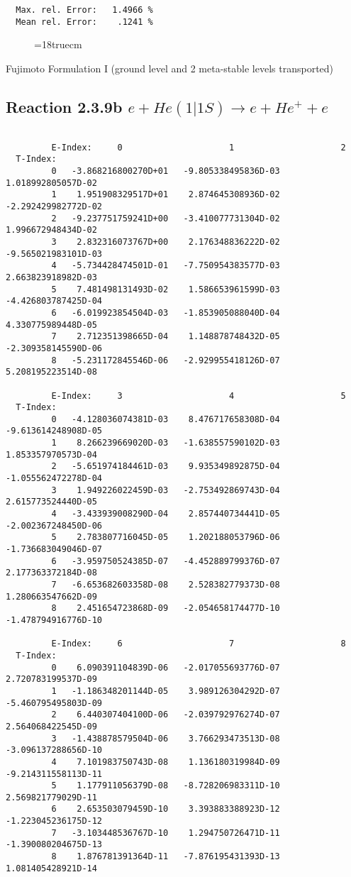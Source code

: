 \begin{verbatim}
  Max. rel. Error:   1.4966 %
  Mean rel. Error:    .1241 %

\end{verbatim}
\begin{figure} \label{2.3.9a}
\epsfxsize=18truecm
\end{figure}
\newpage


 Fujimoto Formulation I (ground level and 2 meta-stable levels transported)

\subsection{
Reaction 2.3.9b  $e + He(1|1S) \rightarrow e + He^+ + e  $
}


\begin{verbatim}

         E-Index:     0                     1                     2
  T-Index:
         0   -3.868216800270D+01   -9.805338495836D-03    1.018992805057D-02
         1    1.951908329517D+01    2.874645308936D-02   -2.292429982772D-02
         2   -9.237751759241D+00   -3.410077731304D-02    1.996672948434D-02
         3    2.832316073767D+00    2.176348836222D-02   -9.565021983101D-03
         4   -5.734428474501D-01   -7.750954383577D-03    2.663823918982D-03
         5    7.481498131493D-02    1.586653961599D-03   -4.426803787425D-04
         6   -6.019923854504D-03   -1.853905088040D-04    4.330775989448D-05
         7    2.712351398665D-04    1.148878748432D-05   -2.309358145590D-06
         8   -5.231172845546D-06   -2.929955418126D-07    5.208195223514D-08

         E-Index:     3                     4                     5
  T-Index:
         0   -4.128036074381D-03    8.476717658308D-04   -9.613614248908D-05
         1    8.266239669020D-03   -1.638557590102D-03    1.853357970573D-04
         2   -5.651974184461D-03    9.935349892875D-04   -1.055562472278D-04
         3    1.949226022459D-03   -2.753492869743D-04    2.615773524440D-05
         4   -3.433939008290D-04    2.857440734441D-05   -2.002367248450D-06
         5    2.783807716045D-05    1.202188053796D-06   -1.736683049046D-07
         6   -3.959750524385D-07   -4.452889799376D-07    2.177363372184D-08
         7   -6.653682603358D-08    2.528382779373D-08    1.280663547662D-09
         8    2.451654723868D-09   -2.054658174477D-10   -1.478794916776D-10

         E-Index:     6                     7                     8
  T-Index:
         0    6.090391104839D-06   -2.017055693776D-07    2.720783199537D-09
         1   -1.186348201144D-05    3.989126304292D-07   -5.460795495803D-09
         2    6.440307404100D-06   -2.039792976274D-07    2.564068422545D-09
         3   -1.438878579504D-06    3.766293473513D-08   -3.096137288656D-10
         4    7.101983750743D-08    1.136180319984D-09   -9.214311558113D-11
         5    1.177911056379D-08   -8.728206983311D-10    2.569821779029D-11
         6    2.653503079459D-10    3.393883388923D-12   -1.223045236175D-12
         7   -3.103448536767D-10    1.294750726471D-11   -1.390080204675D-13
         8    1.876781391364D-11   -7.876195431393D-13    1.081405428921D-14


\end{verbatim}
